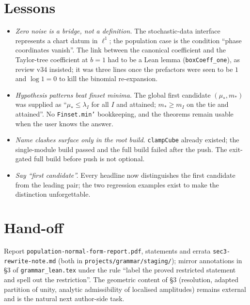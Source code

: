 \documentclass[11pt]{article}
\begin{document}
\section{Lessons}
\begin{itemize}
\item \emph{Zero noise is a bridge, not a definition.} The stochastic-data interface represents a
chart datum in $\ell^1$; the population case is the condition ``phase coordinates vanish''. The link
between the canonical coefficient and the Taylor-tree coefficient at $b=1$ had to be a Lean lemma
(\texttt{boxCoeff\_one}), as review v34 insisted; it was three lines once the prefactors were seen to
be $1$ and $\log1=0$ to kill the binomial re-expansion.
\item \emph{Hypothesis patterns beat finset minima.} The global first candidate $(\mu_*,m_*)$ was
supplied as ``$\mu_*\le\lambda_I$ for all $I$ and attained; $m_*\ge m_I$ on the tie and attained''.
No \texttt{Finset.min'} bookkeeping, and the theorems remain usable when the user knows the answer.
\item \emph{Name clashes surface only in the root build.} \texttt{clampCube} already existed; the
single-module build passed and the full build failed after the push. The exit-gated full build before
push is not optional.
\item \emph{Say ``first candidate''.} Every headline now distinguishes the first candidate from the
leading pair; the two regression examples exist to make the distinction unforgettable.
\end{itemize}

\section{Hand-off}
Report \texttt{population-normal-form-report.pdf}, statements and errata
\texttt{sec3-rewrite-note.md} (both in \texttt{projects/grammar/staging/}); mirror annotations in
\S3 of \texttt{grammar\_lean.tex} under the rule ``label the proved restricted statement and spell out
the restriction''. The geometric content of \S3 (resolution, adapted partition of unity, analytic
admissibility of localised amplitudes) remains external and is the natural next author-side task.
\end{document}
